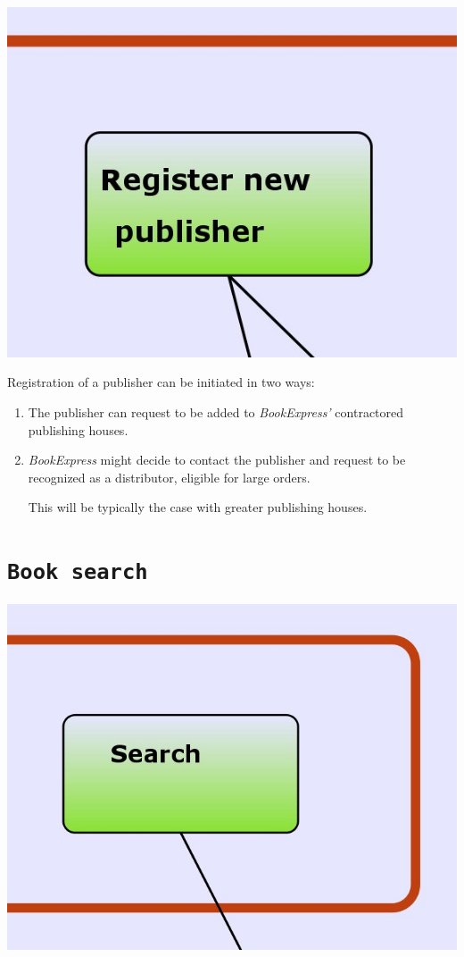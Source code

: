 \includegraphics[scale=0.8]{screenshots/Register_publisher.jpeg}

Registration of a publisher can be initiated in two ways:
\begin{enumerate}
	\item The publisher can request to be added to \emph{BookExpress'} contractored publishing houses.
	\item \emph{BookExpress} might decide to contact the publisher and request to be recognized as a distributor, eligible for large orders.
	      
		  This will be typically the case with greater publishing houses.
\end{enumerate}


\section{\texttt{Book search}}

\includegraphics[scale=0.8]{screenshots/search.jpeg}

